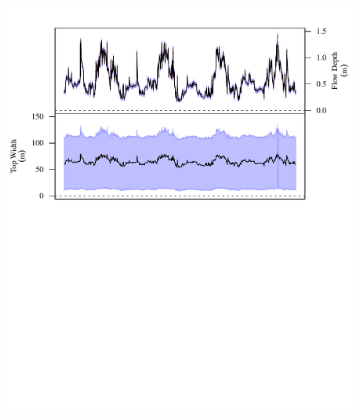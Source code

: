 \begin{linenumbers}
\subfiguretop
\begin{landscape}
	\begin{figure}
		\begin{subfigure}{0.7\textwidth}
			\centering
			\includegraphics[width=\tableCustomSize]{"Figures/Results_USR/Stochastic/G TS A"}
			\label{sub:GeoTS_A}
		\end{subfigure}%
		\begin{subfigure}{0.7\textwidth}
			\centering

\end{subfigure}
\end{figure}
\end{landscape}
\end{linenumbers}
